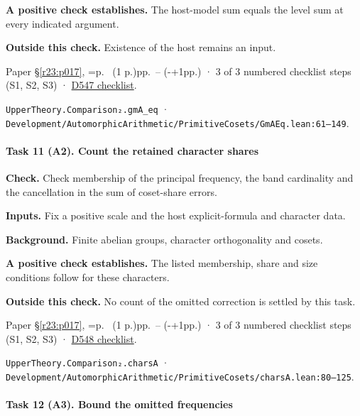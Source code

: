 \textbf{A positive check establishes.} The host-model sum equals the level sum at every indicated argument.

\textbf{Outside this check.} Existence of the host remains an input.

Paper \S\ref{r23:p017}, \ifnum{}=\relax p.\ \pageref{v5:chars-start} (1 p.)\else pp.\ \pageref{v5:chars-start}--\pageref{v5:d547-end} (\number\numexpr{}-+1\relax pp.)\fi{} · 3 of 3 numbered checklist steps (S1, S2, S3) · \href{https://github.com/GunheeC/rh-lean-verification-atlas/blob/v0.1.0/units/D547.check.md}{D547 checklist}.

\nolinkurl{UpperTheory.Comparison₂.gmA_eq} · \nolinkurl{Development/AutomorphicArithmetic/PrimitiveCosets/GmAEq.lean:61–149}.

\paragraph{Task 11 (A2). Count the retained character shares}\label{v7:task-11}

\textbf{Check.} Check membership of the principal frequency, the band cardinality and the cancellation in the sum of coset-share errors.

\textbf{Inputs.} Fix a positive scale and the host explicit-formula and character data.

\textbf{Background.} Finite abelian groups, character orthogonality and cosets.

\textbf{A positive check establishes.} The listed membership, share and size conditions follow for these characters.

\textbf{Outside this check.} No count of the omitted correction is settled by this task.

Paper \S\ref{r23:p017}, \ifnum{}=\relax p.\ \pageref{v5:d547-end} (1 p.)\else pp.\ \pageref{v5:d547-end}--\pageref{v5:d548-end} (\number\numexpr{}-+1\relax pp.)\fi{} · 3 of 3 numbered checklist steps (S1, S2, S3) · \href{https://github.com/GunheeC/rh-lean-verification-atlas/blob/v0.1.0/units/D548.check.md}{D548 checklist}.

\nolinkurl{UpperTheory.Comparison₂.charsA} · \nolinkurl{Development/AutomorphicArithmetic/PrimitiveCosets/charsA.lean:80–125}.

\paragraph{Task 12 (A3). Bound the omitted frequencies}\label{v7:task-12}

